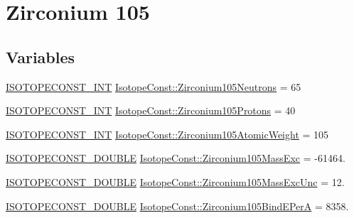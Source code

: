 \hypertarget{group___isotope_const-_zirconium-_zr105}{}\section{Zirconium 105}
\label{group___isotope_const-_zirconium-_zr105}
\subsection*{Variables}
\begin{DoxyCompactItemize}
\item 
\mbox{\hyperlink{group___isotope_const-_macros_ga5f18360b3e99483a35c32d789e62621c}{I\+S\+O\+T\+O\+P\+E\+C\+O\+N\+S\+T\+\_\+\+I\+NT}} \mbox{\hyperlink{group___isotope_const-_zirconium-_zr105_ga78e0d7c3884b4a3a11ff0ab227e0429e}{Isotope\+Const\+::\+Zirconium105\+Neutrons}} = 65
\item 
\mbox{\hyperlink{group___isotope_const-_macros_ga5f18360b3e99483a35c32d789e62621c}{I\+S\+O\+T\+O\+P\+E\+C\+O\+N\+S\+T\+\_\+\+I\+NT}} \mbox{\hyperlink{group___isotope_const-_zirconium-_zr105_gae532e434485d6dff9c8f589cf54dce54}{Isotope\+Const\+::\+Zirconium105\+Protons}} = 40
\item 
\mbox{\hyperlink{group___isotope_const-_macros_ga5f18360b3e99483a35c32d789e62621c}{I\+S\+O\+T\+O\+P\+E\+C\+O\+N\+S\+T\+\_\+\+I\+NT}} \mbox{\hyperlink{group___isotope_const-_zirconium-_zr105_ga1f24e4f7b8fd7e7d8bcc2fd84015fb89}{Isotope\+Const\+::\+Zirconium105\+Atomic\+Weight}} = 105
\item 
\mbox{\hyperlink{group___isotope_const-_macros_ga8f45a7272ce02c0b4c65c44636ed719a}{I\+S\+O\+T\+O\+P\+E\+C\+O\+N\+S\+T\+\_\+\+D\+O\+U\+B\+LE}} \mbox{\hyperlink{group___isotope_const-_zirconium-_zr105_ga9b3ff5620022248aee79eb1b7e5ce484}{Isotope\+Const\+::\+Zirconium105\+Mass\+Exc}} = -\/61464.
\item 
\mbox{\hyperlink{group___isotope_const-_macros_ga8f45a7272ce02c0b4c65c44636ed719a}{I\+S\+O\+T\+O\+P\+E\+C\+O\+N\+S\+T\+\_\+\+D\+O\+U\+B\+LE}} \mbox{\hyperlink{group___isotope_const-_zirconium-_zr105_ga5757a4da0c7ab56874fd57226f113b7b}{Isotope\+Const\+::\+Zirconium105\+Mass\+Exc\+Unc}} = 12.
\item 
\mbox{\hyperlink{group___isotope_const-_macros_ga8f45a7272ce02c0b4c65c44636ed719a}{I\+S\+O\+T\+O\+P\+E\+C\+O\+N\+S\+T\+\_\+\+D\+O\+U\+B\+LE}} \mbox{\hyperlink{group___isotope_const-_zirconium-_zr105_gaf633b392502671f380281aa2db7d8e07}{Isotope\+Const\+::\+Zirconium105\+Bind\+E\+PerA}} = 8358.
\item 

\end{DoxyCompactItemize}
